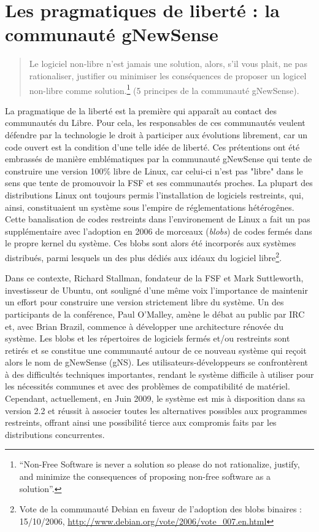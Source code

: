 \section{Les pragmatiques de liberté : la communauté gNewSense} \label{3.1}

\begin{quote}
Le logiciel non-libre n'est jamais une solution, alors, s'il vous plait, ne pas rationaliser, justifier ou minimiser les conséquences de proposer un logicel non-libre comme solution.\footnote{“Non-Free Software is never a solution so please do not rationalize, justify, and minimize the consequences of proposing non-free software as a solution”.} (5 principes de la communauté gNewSense).
\end{quote}

La pragmatique de la liberté est la première qui apparaît au contact des communautés du Libre. Pour cela, les responsables de ces communautés veulent défendre par la technologie le droit à participer aux évolutions librement, car un code ouvert est la condition d'une telle idée de liberté. Ces prétentions ont été embrassés de manière emblématiques par la communauté gNewSense qui tente de construire une version 100\% libre de Linux, car celui-ci n'est pas "libre" dans le sens que tente de promouvoir la FSF et ses communautés proches. La plupart des distributions Linux ont toujours permis l'installation de logiciels restreints, qui, ainsi, constituaient un système sous l'empire de réglementations hétérogênes. Cette banalisation de codes restreints dans l'environement de Linux a fait un pas supplémentaire avec l'adoption en 2006 de morceaux (\emph{blobs}) de codes fermés dans le propre kernel du système. Ces blobs sont alors été incorporés aux systèmes distribués, parmi lesquels un des plus dédiés aux idéaux du logiciel libre\footnote{Vote de la communauté Debian en faveur de l'adoption des blobs binaires : 15/10/2006, \url{http://www.debian.org/vote/2006/vote_007.en.html}}.

Dans ce contexte, Richard Stallman, fondateur de la FSF et Mark Suttleworth, investisseur de Ubuntu, ont souligné d'une même voix l'importance de maintenir un effort pour construire une version strictement libre du système. Un des participants de la conférence, Paul O'Malley, amène le débat au public par IRC et, avec Brian Brazil, commence à développer une architecture rénovée du système. Les blobs et les répertoires de logiciels fermés et/ou restreints sont retirés et se constitue une communauté autour de ce nouveau système qui reçoit alors le nom de gNewSense (gNS). Les utilisateurs-développeurs se confrontèrent à des difficultés techniques importantes, rendant le système difficile à utiliser pour les nécessités communes et avec des problèmes de compatibilité de matériel. Cependant, actuellement, en Juin 2009, le système est mis à disposition dans sa version 2.2 et réussit à associer toutes les alternatives possibles aux programmes restreints, offrant ainsi une possibilité tierce aux compromis faits par les distributions concurrentes.

